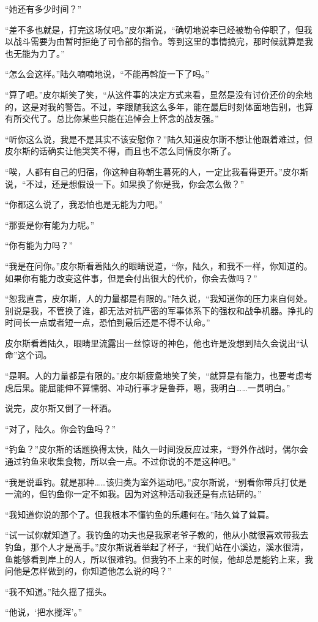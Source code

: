 “她还有多少时间？”

“差不多也就是，打完这场仗吧。”皮尔斯说，“确切地说李已经被勒令停职了，但我以战斗需要为由暂时拒绝了司令部的指令。等到这里的事情搞完，那时候就算是我也无能为力了。”

“怎么会这样。”陆久喃喃地说，“不能再斡旋一下了吗。”

“算了吧。”皮尔斯笑了笑，“从这件事的决定方式来看，显然是没有讨价还价的余地的，这是对我的警告。不过，李跟随我这么多年，能在最后时刻体面地告别，也算有所交代了。总比你某些只能在追悼会上怀念的战友强。”

“听你这么说，我是不是其实不该安慰你？”陆久知道皮尔斯不想让他跟着难过，但皮尔斯的话确实让他哭笑不得，而且也不怎么同情皮尔斯了。

“唉，人都有自己的归宿，你这种自称朝生暮死的人，一定比我看得更开。”皮尔斯说，“不过，还是想假设一下。如果换了你是我，你会怎么做？”

“你都这么说了，我恐怕也是无能为力吧。”

“那要是你有能为力呢。”

“你有能为力吗？”

“我是在问你。”皮尔斯看着陆久的眼睛说道，“你，陆久，和我不一样，你知道的。如果你有能力改变这件事，但是会付出很大的代价，你会去做吗？”

“恕我直言，皮尔斯，人的力量都是有限的。”陆久说，“我知道你的压力来自何处。别说是我，不管换了谁，都无法对抗严密的军事体系下的强权和战争机器。挣扎的时间长一点或者短一点，恐怕到最后还是不得不认命。”

皮尔斯看着陆久，眼睛里流露出一丝惊讶的神色，他也许是没想到陆久会说出“认命”这个词。

“是啊。人的力量都是有限的。”皮尔斯疲惫地笑了笑，“就算是有能力，也要考虑考虑后果。能屈能伸不算懦弱、冲动行事才是鲁莽，嗯，我明白……一贯明白。”

说完，皮尔斯又倒了一杯酒。

“对了，陆久。你会钓鱼吗？”

“钓鱼？”皮尔斯的话题换得太快，陆久一时间没反应过来，“野外作战时，偶尔会通过钓鱼来收集食物，所以会一点。不过你说的不是这种吧。”

“我是说垂钓。就是那种……该归类为室外运动吧。”皮尔斯说，“别看你带兵打仗是一流的，但钓鱼你一定不如我。因为对这种活动我还是有点钻研的。”

“我知道你说的那个了。但我根本不懂钓鱼的乐趣何在。”陆久耸了耸肩。

“试一试你就知道了。我钓鱼的功夫也是我家老爷子教的，他从小就很喜欢带我去钓鱼，那个人才是高手。”皮尔斯说着举起了杯子，“我们站在小溪边，溪水很清，鱼能够看到岸上的人，所以很难钓。但我钓不上来的时候，他却总是能钓上来，我问他是怎样做到的，你知道他怎么说的吗？”

“我不知道。”陆久摇了摇头。

“他说，‘把水搅浑’。”


